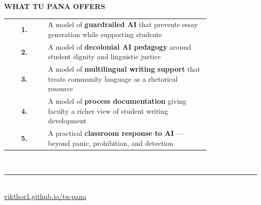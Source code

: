 \documentclass[aspectratio=169]{beamer}
\begin{document}
{%
\begin{frame}[plain,c]
  \begin{center}
    {\color{tpgold}\small\bfseries\MakeUppercase{What Tu Pana Offers}}\\[1.3em]
    {\color{tpwarm}\small
      \renewcommand{\arraystretch}{1.6}
      \begin{tabular}{cp{0.80\linewidth}}
        {\color{tpgold}\bfseries 1.} &
          A model of \textbf{guardrailed AI} that prevents essay generation
          while supporting students\\
        {\color{tpgold}\bfseries 2.} &
          A model of \textbf{decolonial AI pedagogy} around student dignity
          and linguistic justice\\
        {\color{tpgold}\bfseries 3.} &
          A model of \textbf{multilingual writing support} that treats
          community language as a rhetorical resource\\
        {\color{tpgold}\bfseries 4.} &
          A model of \textbf{process documentation} giving faculty a richer
          view of student writing development\\
        {\color{tpgold}\bfseries 5.} &
          A practical \textbf{classroom response to AI} — beyond panic,
          prohibition, and detection\\
      \end{tabular}
    }\\[1.5em]
    {\color{tpborder}\rule{10em}{0.4pt}}\\[0.8em]
    {\color{tpgold}\small
      \href{https://vikthor1.github.io/tu-pana/}{vikthor1.github.io/tu-pana}}
  \end{center}
\end{frame}}
\end{document}
